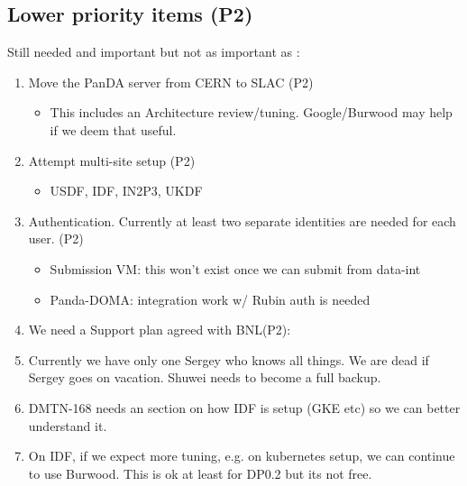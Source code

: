 \subsection {Lower priority items (P2)}
Still needed and important but not as important as :
\begin{enumerate}
\item Move the PanDA server from CERN to SLAC  (P2)
\begin{itemize}
\item This includes an Architecture review/tuning.  Google/Burwood may help if we deem that useful.
\end{itemize}
\item Attempt multi-site setup (P2)
\begin{itemize}
\item USDF, IDF, IN2P3, UKDF
\end{itemize}
\item Authentication. Currently at least two separate identities are needed for each user. (P2)
\begin{itemize}
\item Submission VM: this won't exist once we can submit from data-int
\item Panda-DOMA: integration work w/ Rubin auth is needed
\end{itemize}
\item We need a Support plan agreed with BNL(P2):
\item Currently we have only one Sergey who knows all things.  We are dead if Sergey goes on vacation.  Shuwei needs to become a full backup.
\item DMTN-168 needs an section on how IDF is setup (GKE etc) so we can better understand it.
\item On IDF, if  we expect more tuning, e.g. on kubernetes setup, we can continue to use Burwood. This is ok at least for DP0.2 but its not free.
\end{enumerate}
